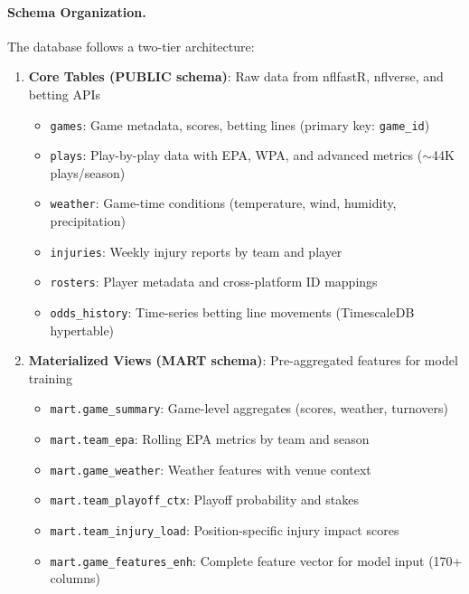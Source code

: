 \paragraph{Schema Organization.}
The database follows a two-tier architecture:
\begin{enumerate}
    \item \textbf{Core Tables (PUBLIC schema)}: Raw data from nflfastR, nflverse, and betting APIs
    \begin{itemize}
        \item \texttt{games}: Game metadata, scores, betting lines (primary key: \texttt{game\_id})
        \item \texttt{plays}: Play-by-play data with EPA, WPA, and advanced metrics ($\sim$44K plays/season)
        \item \texttt{weather}: Game-time conditions (temperature, wind, humidity, precipitation)
        \item \texttt{injuries}: Weekly injury reports by team and player
        \item \texttt{rosters}: Player metadata and cross-platform ID mappings
        \item \texttt{odds\_history}: Time-series betting line movements (TimescaleDB hypertable)
    \end{itemize}

    \item \textbf{Materialized Views (MART schema)}: Pre-aggregated features for model training
    \begin{itemize}
        \item \texttt{mart.game\_summary}: Game-level aggregates (scores, weather, turnovers)
        \item \texttt{mart.team\_epa}: Rolling EPA metrics by team and season
        \item \texttt{mart.game\_weather}: Weather features with venue context
        \item \texttt{mart.team\_playoff\_ctx}: Playoff probability and stakes
        \item \texttt{mart.team\_injury\_load}: Position-specific injury impact scores
        \item \texttt{mart.game\_features\_enh}: Complete feature vector for model input (170+ columns)
    \end{itemize}
\end{enumerate}

